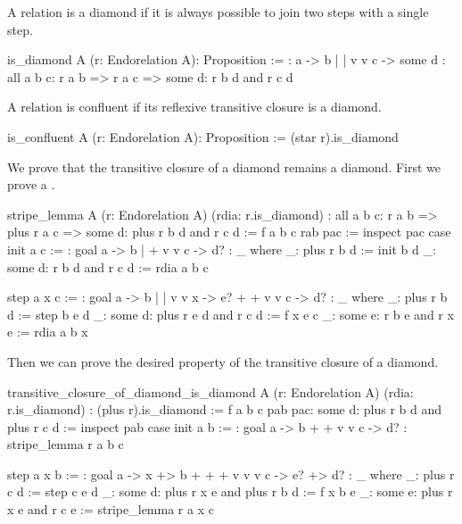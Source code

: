 A relation is a diamond if it is always possible to join two steps with a
single step.

\begin{alba}
  is_diamond A (r: Endorelation A): Proposition :=
      {:   a  ->  b
           |      |
           v      v
           c  -> some d :}
    all a b c:
      r a b
      => r a c
      => some d: r b d and r c d
\end{alba}


A relation is confluent if its reflexive transitive closure is a diamond.

\begin{alba}
  is_confluent A (r: Endorelation A): Proposition :=
    (star r).is_diamond
\end{alba}



We prove that the transitive closure of a diamond remains a diamond. First we
prove a .


\begin{alba}
   stripe_lemma
     A
     (r: Endorelation A)
     (rdia: r.is_diamond)
     : all a b c:
         r a b
         => plus r a c
         => some d: plus r b d and r c d :=
       f a b c rab pac :=
         inspect pac case
           init a c :=
             {: goal a  ->  b
                     |      +
                     v      v
                     c  ->  d? :}
             _ where
               _: plus r b d := init b d
               _: some d: r b d and r c d := rdia a b c

           step a x c :=
             {: goal a   ->   b
                     |        |
                     v        v
                     x   ->   e?
                     +        +
                     v        v
                     c  ->    d?  :}
             _ where
               _: plus r b d := step b e d
               _: some d: plus r e d and r c d := f x e c
               _: some e: r b e and r x e := rdia a b x
\end{alba}

Then we can prove the desired property of the transitive closure of a diamond.

\begin{alba}
  transitive_closure_of_diamond_is_diamond
    A
    (r: Endorelation A)
    (rdia: r.is_diamond)
    : (plus r).is_diamond :=
      f a b c pab pac: some d: plus r b d and plus r c d :=
        inspect pab case
          init a b :=
            {: goal  a -> b
                     +    +
                     v    v
                     c -> d?  :}
            stripe_lemma r a b c

          step a x b :=
            {: goal a -> x  +> b
                    +    +     +
                    v    v     v
                    c -> e? +> d? :}
            _ where
               _: plus r c d := step c e d
               _: some d: plus r x e and plus r b d := f x b e
               _: some e: plus r x e and r c e :=  stripe_lemma r a x c
\end{alba}
%




